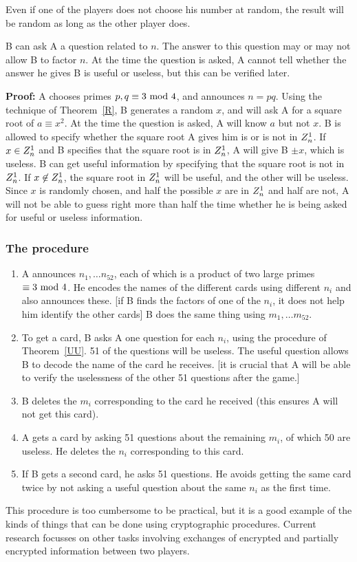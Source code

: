 Even if one of the players does not choose his number at random,
the result will be random as long as the other player does.
\begin{Th}\label{UU}B can ask A a question related to $n$.  The answer to
this question may or may not allow B to factor $n$.  At the time
the question is asked, A cannot tell whether the answer he gives
B is useful or  useless, but this can be verified later.\end{Th}
{\bf Proof:} A chooses primes $p,q\equiv3\hbox{ mod }4$, and announces $n=pq$.
 Using the technique of Theorem~\ref{R}, B generates a random $x$, and
will ask A for a square root of $a\equiv x^2$.  At the time the
question is asked, A will know $a$ but not $x$.  B is allowed to
specify whether the square root A gives him is or is not in $Z^1_n$.\pq
 If $x\in Z^1_n$ and B specifies that the square root is in $Z^1_n$,
A will give B $\pm x$, which is useless.  B can get useful information
by specifying that the square root is not in $Z^1_n$.  If $x\not\in Z^1_n$,
the square root in $Z^1_n$ will be useful, and the other will be
useless.  \pq Since $x$ is  randomly chosen, and half the possible
$x$ are in $Z^1_n$ and half are not, A will not be able to guess
right more than half the time whether he is being asked for useful
or useless information.
\subsubsection*{The procedure}
\begin{enumerate}\item A announces $n_1,\dots n_{52}$, each of
which is a product of two large primes $\equiv3\hbox{ mod }4$.  He encodes the
names of the different cards using different $n_i$ and also announces
these.  [if B finds the factors
of one of the $n_i$, it does not help him identify the other cards]
B does the same thing using $m_1,\dots m_{52}$.
\item To get a card, B asks A one question for each $n_i$, using
the procedure of Theorem~\ref{UU}.  51 of the questions will be useless.
 The  useful question allows B to decode the name of the card he
receives. [it is crucial that A will be able to verify the uselessness
of the other 51 questions after the game.]
\item B deletes the $m_i$ corresponding to the card he received
(this ensures A will not get this card).
\item A gets a card by asking 51 questions about the remaining
$m_i$,  of which 50 are useless.
He deletes the $n_i$ corresponding to this card.
\item If B gets a second card, he asks 51 questions.  He avoids
getting the same card twice by not asking a useful question about
the same $n_i$ as the first time.\end{enumerate}
This procedure is too cumbersome to be practical, but it is a good
example of the kinds of things that can be done using cryptographic
procedures.  Current research focusses on other tasks involving
exchanges of encrypted and partially encrypted information between
two players. 

